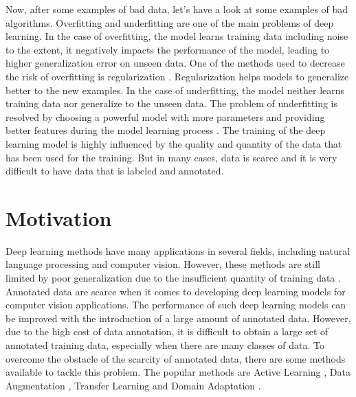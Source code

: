 Now, after some examples of bad data, let's have a look at some examples of bad algorithms. Overfitting and underfitting are one of the main problems of deep learning. In the case of overfitting, the model learns training data including noise to the extent, it negatively impacts the performance of the model, leading to higher generalization error on unseen data. One of the methods used to decrease the risk of overfitting is regularization \cite{kukacka2017regularization}. Regularization helps models to generalize better to the new examples. In the case of underfitting, the model neither learns training data nor generalize to the unseen data. The problem of underfitting is resolved by choosing a powerful model with more parameters and providing better features during the model learning process \cite{10.5555/3153997}. The training of the deep learning model is highly influenced by the quality and quantity of the data that has been used for the training. But in many cases, data is scarce and it is very difficult to have data that is labeled and annotated.





\section{Motivation}\label{motivation}

Deep learning methods have many applications in several fields, including natural language processing and computer vision. However, these methods are still limited by poor generalization due to the insufficient quantity of training data \cite{8978087}. Annotated data are scarce when it comes to developing deep learning models for computer vision applications. The performance of such deep learning models can be improved with the introduction of a large amount of annotated data. However, due to the high cost of data annotation, it is difficult to obtain a large set of annotated training data, especially when there are many classes of data. To overcome the obstacle of the scarcity of annotated data, there are some methods available to tackle this problem. The popular methods are Active Learning \cite{hemmer2020deal}, Data Augmentation \cite{Shorten.2019}, Transfer Learning \cite{zhuang2020comprehensive} and Domain Adaptation \cite{redko2020survey}. 

